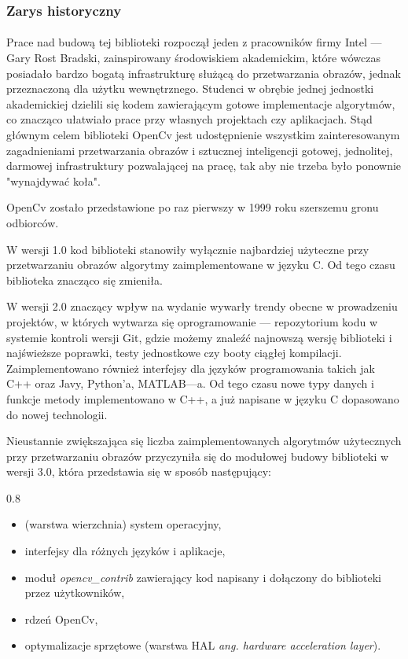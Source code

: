\documentclass[a4paper,12pt]{article}
\newcommand\spacingInSimpleItemize{0.8}
\begin{document}
		\subsubsection{Zarys historyczny}
			\paragraph{\indent} Prace nad budową tej biblioteki rozpoczął jeden z pracowników firmy Intel --- Gary Rost Bradski, 
				zainspirowany środowiskiem akademickim, które wówczas posiadało bardzo bogatą infrastrukturę służącą do przetwarzania obrazów, 
				jednak przeznaczoną dla użytku wewnętrznego. Studenci w obrębie jednej jednostki akademickiej dzielili się kodem zawierającym gotowe 
				implementacje algorytmów, co znacząco ułatwiało prace przy własnych projektach czy aplikacjach. Stąd głównym celem biblioteki OpenCv 
				jest udostępnienie wszystkim zainteresowanym zagadnieniami przetwarzania obrazów i sztucznej inteligencji gotowej, jednolitej, 
				darmowej infrastruktury pozwalającej na pracę, tak aby nie trzeba było ponownie "wynajdywać koła".
			\par OpenCv zostało przedstawione po raz pierwszy w 1999 roku szerszemu gronu odbiorców. 
			\par W wersji 1.0 kod biblioteki stanowiły wyłącznie najbardziej użyteczne przy przetwarzaniu obrazów algorytmy zaimplementowane w języku C. 
				Od tego czasu biblioteka znacząco się zmieniła. 
			\par W wersji 2.0 znaczący wpływ na wydanie wywarły trendy obecne w prowadzeniu projektów, w których wytwarza się oprogramowanie --- repozytorium kodu
				w systemie kontroli wersji Git, gdzie możemy znaleźć najnowszą wersję biblioteki i najświeższe poprawki, testy jednostkowe czy booty ciągłej kompilacji. 
				Zaimplementowano również interfejsy dla języków programowania takich jak C++ oraz Javy, Python’a, MATLAB---a. Od tego czasu nowe typy danych 
				i funkcje metody implementowano w C++, a już napisane w języku C dopasowano do nowej technologii. 
			\par Nieustannie zwiększająca się liczba zaimplementowanych algorytmów użytecznych przy przetwarzaniu obrazów przyczyniła się do modułowej budowy 
				biblioteki w wersji 3.0, która przedstawia się w sposób następujący:
                
                \begin{spacing}{\spacingInSimpleItemize}
    				\begin{itemize}
    					\item (warstwa wierzchnia) system operacyjny,
    					\item interfejsy dla różnych języków i aplikacje,
    					\item moduł \textit {opencv\_contrib} zawierający kod napisany i dołączony do biblioteki przez użytkowników,
    					\item rdzeń OpenCv,
    					\item optymalizacje sprzętowe (warstwa HAL \textit {ang. hardware acceleration layer}).
    				\end{itemize} 
                \end{spacing}
            
\end{document}

